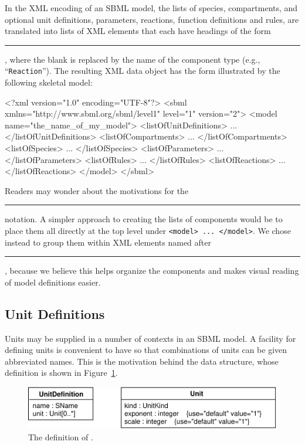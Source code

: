 \documentclass[10pt]{cekarticle}
\newcommand{\vref}[1]{\ref{#1}}
\begin{document}
In the XML encoding of an SBML model, the lists of species, compartments,
and optional unit definitions, parameters, reactions, function definitions
and rules, are translated into lists of XML elements that each have
headings of the form \rule{0.5in}{0.5pt}, where the
blank is replaced by the name of the component type (e.g.,
``\texttt{Reaction}'').  The resulting XML data object has the form
illustrated by the following skeletal model:

\begin{example}
<?xml version="1.0" encoding="UTF-8"?>
<sbml xmlns="http://www.sbml.org/sbml/level1" level="1" version="2">
  <model name="the_name_of_my_model">
    <listOfUnitDefinitions>
        ...
    </listOfUnitDefinitions>
    <listOfCompartments>
        ...
    </listOfCompartments>
    <listOfSpecies>
        ...
    </listOfSpecies>
    <listOfParameters>
        ...
    </listOfParameters>
    <listOfRules>
        ...
    </listOfRules>
    <listOfReactions>
        ...
    </listOfReactions>
  </model>
</sbml>
\end{example}

Readers may wonder about the motivations for the
\rule{0.5in}{0.5pt} notation.  A simpler approach to
creating the lists of components would be to place them all directly
at the top level under \texttt{<model> ... </model>}.  We chose instead to
group them within XML elements named after
\rule{0.5in}{0.5pt}, because we believe this helps
organize the components and makes visual reading of model definitions
easier.


\subsection{Unit Definitions}
\label{sec:unitdefinitions}

Units may be supplied in a number of contexts in an SBML model.  A facility
for defining units is convenient to have so that combinations of units can
be given abbreviated names.  This is the motivation behind the
 data structure, whose definition is shown in
Figure~\vref{fig:unitdefinition}.

\begin{figure}[htb]
  \centering
  \includegraphics[scale = 0.68]{unitdefinition}
  \caption{The definition of .}
  \label{fig:unitdefinition}
\end{figure}
\end{document}

